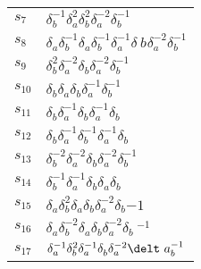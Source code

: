 \documentclass{article}
\begin{document}
\begin{center}
\begin{tabular}{ll}
$s_{7}$ & $\delta_b^{-1}\delta_a^{2}\delta_b^{2}\delta_a^{-2}\delta_b^{-1}$ \\
$s_{8}$ & $\delta_a^{}\delta_b^{-1}\delta_a^{}\delta_b^{-1}\delta_a^{-1}\delta_\
b^{}\delta_a^{-2}\delta_b^{-1}$ \\
$s_{9}$ & $\delta_b^{2}\delta_a^{-2}\delta_b^{}\delta_a^{-2}\delta_b^{-1}$ \\
$s_{10}$ & $\delta_b^{}\delta_a^{}\delta_b^{}\delta_a^{-1}\delta_b^{-1}$ \\
$s_{11}$ & $\delta_b^{}\delta_a^{-1}\delta_b^{}\delta_a^{-1}\delta_b^{}$ \\
$s_{12}$ & $\delta_b^{}\delta_a^{-1}\delta_b^{-1}\delta_a^{-1}\delta_b^{}$ \\
$s_{13}$ & $\delta_b^{-2}\delta_a^{-2}\delta_b^{}\delta_a^{-2}\delta_b^{-1}$ \\
$s_{14}$ & $\delta_b^{-1}\delta_a^{-1}\delta_b^{}\delta_a^{}\delta_b^{}$ \\
$s_{15}$ & $\delta_a^{}\delta_b^{2}\delta_a^{}\delta_b^{}\delta_a^{-2}\delta_b^\
{-1}$ \\
$s_{16}$ & $\delta_a^{}\delta_b^{-2}\delta_a^{}\delta_b^{}\delta_a^{-2}\delta_b\
^{-1}$ \\
$s_{17}$ & $\delta_a^{-1}\delta_b^{2}\delta_a^{-1}\delta_b^{}\delta_a^{-2}\delt\
a_b^{-1}$ \\
\bottomrule
\end{tabular}
\end{center}

\thispagestyle{empty}
\end{document}
